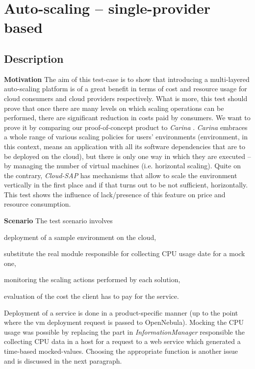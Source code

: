 \newpage
\section{Auto-scaling -- single-provider based}
\subsection*{Description}
\begin{asparaenum}
\item[\textbf{Motivation}]The aim of this test-case is to show that introducing a multi-layered auto-scaling platform is of a great benefit in terms of cost and resource usage for cloud consumers and cloud providers respectively. What is more, this test should prove that once there are many levels on which scaling operations can be performed, there are significant reduction in costs paid by consumers.
We want to prove it by comparing our proof-of-concept product to \emph{Carina} \cite{Carina}. \emph{Carina} embraces a whole range of various scaling policies for users' environments (environment, in this context, means an application with all its software dependencies that are to be deployed on the cloud), but there is only one way in which they are executed -- by managing the number of virtual machines (i.e. horizontal scaling). Quite on the contrary, \emph{Cloud-SAP} has mechanisms that allow to scale the environment vertically in the first place and if that turns out to be not sufficient, horizontally. This test shows the influence of lack/presence of this feature on price and resource consumption.
\item[\textbf{Scenario}] The test scenario involves
  \begin{inparaenum}[a)]
    \item deployment of a sample environment on the cloud,
    \item substitute the real module responsible for collecting CPU usage date for a mock one,
    \item monitoring the scaling actions performed by each solution,
    \item evaluation of the cost the client has to pay for the service.
  \end{inparaenum}
  Deployment of a service is done in a product-specific manner (up to the point where the vm deployment request is passed to OpenNebula). Mocking the CPU usage was possible by replacing the part in \emph{InformationManager} responsible the collecting CPU data in a host for a request to a web service which generated a time-based mocked-values. Choosing the appropriate function is another issue and is discussed in the next paragraph.
\end{asparaenum}


